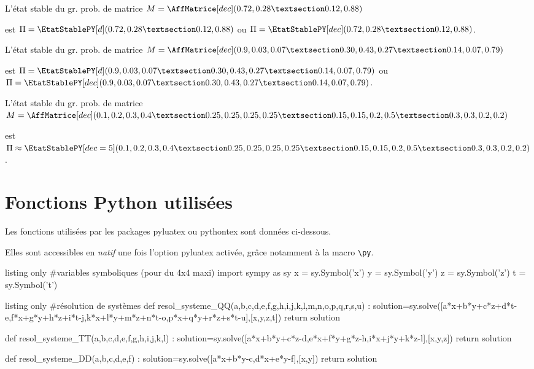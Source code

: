 \documentclass[french,a4paper,11pt]{article}
\begin{document}
\begin{PresentationCode}{}
L'état stable du gr. prob. de matrice
$M=\AffMatrice[dec](0.72,0.28 § 0.12,0.88)$

est $\Pi = \EtatStablePY[d](0.72,0.28 § 0.12,0.88)$
ou $\Pi = \EtatStablePY[dec](0.72,0.28 § 0.12,0.88)$.
\end{PresentationCode}

\begin{PresentationCode}{}
L'état stable du gr. prob. de matrice
$M=\AffMatrice[dec](0.9,0.03,0.07 § 0.30,0.43,0.27 § 0.14,0.07,0.79)$

est $\Pi = \EtatStablePY[d](0.9,0.03,0.07 § 0.30,0.43,0.27 § 0.14,0.07,0.79)$
ou $\Pi = \EtatStablePY[dec](0.9,0.03,0.07 § 0.30,0.43,0.27 § 0.14,0.07,0.79)$.
\end{PresentationCode}

\begin{PresentationCode}{}
L'état stable du gr. prob. de matrice
$M=\AffMatrice[dec]%
	(0.1,0.2,0.3,0.4 § 0.25,0.25,0.25,0.25 § 0.15,0.15,0.2,0.5 § 0.3,0.3,0.2,0.2)$

est $\Pi \approx
\EtatStablePY[dec=5]%
(0.1,0.2,0.3,0.4 § 0.25,0.25,0.25,0.25 § 0.15,0.15,0.2,0.5 § 0.3,0.3,0.2,0.2)$.
\end{PresentationCode}


\pagebreak

\part{Fonctions Python utilisées}

\begin{cautionblock}
Les fonctions utilisées par les packages \textsf{pyluatex} ou \textsf{pythontex} sont données ci-dessous.

Elles sont accessibles en \textit{natif} une fois l'option \textsf{pyluatex} activée, grâce notamment à la macro \texttt{\textbackslash py}.
\end{cautionblock}

\begin{PresentationCodePython}{listing only}
#variables symboliques (pour du 4x4 maxi)
import sympy as sy
x = sy.Symbol('x')
y = sy.Symbol('y')
z = sy.Symbol('z')
t = sy.Symbol('t')
\end{PresentationCodePython}

\begin{PresentationCodePython}{listing only}
#résolution de systèmes
def resol_systeme_QQ(a,b,c,d,e,f,g,h,i,j,k,l,m,n,o,p,q,r,s,u) :
	solution=sy.solve([a*x+b*y+c*z+d*t-e,f*x+g*y+h*z+i*t-j,k*x+l*y+m*z+n*t-o,p*x+q*y+r*z+s*t-u],[x,y,z,t])
	return solution

def resol_systeme_TT(a,b,c,d,e,f,g,h,i,j,k,l) :
	solution=sy.solve([a*x+b*y+c*z-d,e*x+f*y+g*z-h,i*x+j*y+k*z-l],[x,y,z])
	return solution

def resol_systeme_DD(a,b,c,d,e,f) :
	solution=sy.solve([a*x+b*y-c,d*x+e*y-f],[x,y])
	return solution
\end{PresentationCodePython}
\end{document}
